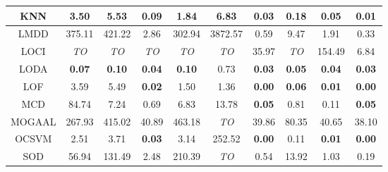 \begin{table*}[!b]
\begin{tabular}{|c|c|c|c|c|c|c|c|c|c|}
\hline
                        KNN &                   3.50 &                        5.53 &          \textbf{0.09} &                         1.84 &                   6.83 &               \textbf{0.03} &                     0.18 &         \textbf{0.05} &          \textbf{0.01} \\
\hline
                        LMDD &                 375.11 &                      421.22 &                   2.86 &                       302.94 &                3872.57 &                        0.59 &                     9.47 &                  1.91 &                   0.33 \\
\hline
                        LOCI &            \textit{TO} &                 \textit{TO} &            \textit{TO} &                  \textit{TO} &            \textit{TO} &                       35.97 &              \textit{TO} &                154.49 &                   6.84 \\
\hline
                        LODA &          \textbf{0.07} &               \textbf{0.10} &          \textbf{0.04} &                \textbf{0.10} &                   0.73 &               \textbf{0.03} &            \textbf{0.05} &         \textbf{0.04} &          \textbf{0.03} \\
\hline
                        LOF &                   3.59 &                        5.49 &          \textbf{0.02} &                         1.50 &                   1.36 &               \textbf{0.00} &            \textbf{0.06} &         \textbf{0.01} &          \textbf{0.00} \\
\hline
                        MCD &                  84.74 &                        7.24 &                   0.69 &                         6.83 &                  13.78 &               \textbf{0.05} &                     0.81 &                  0.11 &          \textbf{0.05} \\
\hline
                        MOGAAL &                 267.93 &                      415.02 &                  40.89 &                       463.18 &            \textit{TO} &                       39.86 &                    80.35 &                 40.65 &                  38.10 \\
\hline
                        OCSVM &                   2.51 &                        3.71 &          \textbf{0.03} &                         3.14 &                 252.52 &               \textbf{0.00} &                     0.11 &         \textbf{0.01} &          \textbf{0.00} \\
\hline
                        SOD &                  56.94 &                      131.49 &                   2.48 &                       210.39 &            \textit{TO} &                        0.54 &                    13.92 &                  1.03 &                   0.19 \\

\end{tabular}
\end{table*}
